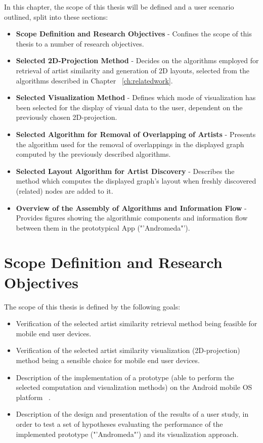 In this chapter, the scope of this thesis will be defined and a user scenario outlined, split into these sections:

\begin{itemize}
	\item \textbf {Scope Definition and Research Objectives} - Confines the scope of this thesis to a number of research objectives.
	\item \textbf {Selected 2D-Projection Method} - Decides on the algorithms employed for retrieval of artist similarity and generation of 2D layouts, selected from the algorithms described in Chapter ~\ref{ch:relatedwork}.
	\item \textbf {Selected Visualization Method} - Defines which mode of visualization has been selected for the display of visual data to the user, dependent on the previously chosen 2D-projection.
	\item \textbf {Selected Algorithm for Removal of Overlapping of Artists} - Presents the algorithm used for the removal of overlappings in the displayed graph computed by the previously described algorithms.
	\item \textbf {Selected Layout Algorithm for Artist Discovery} - Describes the method which computes the displayed graph's layout when freshly discovered (related) nodes are added to it.
	\item \textbf {Overview of the Assembly of Algorithms and Information Flow} - Provides figures showing the algorithmic components and information flow between them in the prototypical App ("'Andromeda"').
\end{itemize}

\section{Scope Definition and Research Objectives}

The scope of this thesis is defined by the following goals: 

\begin{itemize}
	\item Verification of the selected artist similarity retrieval method being feasible for mobile end user devices.
	\item Verification of the selected artist similarity visualization (2D-projection) method being a sensible choice for mobile end user devices.
	\item Description of the implementation of a prototype (able to perform the selected computation and visualization methods) on the Android mobile OS platform ~\cite{url:android}.
	\item Description of the design and presentation of the results of a user study, in order to test a set of hypotheses evaluating the performance of the implemented prototype ("'Andromeda"') and its visualization approach.
\end{itemize}

